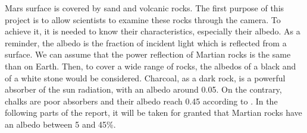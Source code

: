 \label{albedo}
Mars surface is covered by sand and volcanic rocks. The first purpose of this project is to allow scientists to examine these rocks through the camera. To achieve it, it is needed to know their characteristics, especially their albedo. As a reminder, the albedo is the fraction of incident light which is reflected from a surface. We can assume that the power reflection of Martian rocks is the same than on Earth. Then, to cover a wide range of rocks, the albedos of a black and of a white stone would be considered. Charcoal, as a dark rock, is a powerful absorber of the sun radiation, with an albedo around 0.05. On the contrary, chalks are poor absorbers and their albedo reach 0.45 according to \cite{albedo}. In the following parts of the report, it will be taken for granted that Martian rocks have an albedo between 5 and 45\%.
